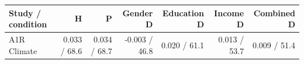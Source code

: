 
\begin{tabular}{lrrrrrr}
\toprule
Study / condition & H & P & Gender D & Education D & Income D & Combined D\\
\midrule
A1R Climate & 0.033 / 68.6 & 0.034 / 68.7 & -0.003 / 46.8 & 0.020 / 61.1 & 0.013 / 53.7 & 0.009 / 51.4\\
\bottomrule
\end{tabular}
